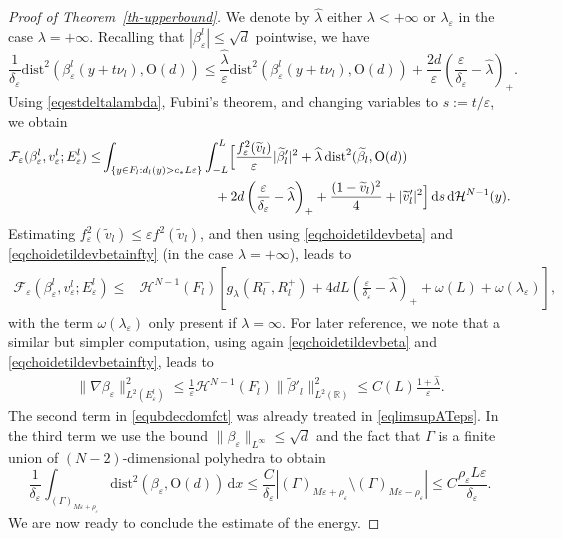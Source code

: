 \documentclass[a4paper,reqno]{amsart}
\newcommand\R{\mathbb{R}}
\newcommand\calH{\mathcal{H}}
\newcommand\dist{{\mathrm{dist}}}
\newcommand\eps{{\varepsilon}}
\theoremstyle{remark}
\newcommand\dx{{\,\mathrm{d}x}}
\newcommand\ds{{\,\mathrm{d}s}}
\newcommand{\F}{\mathcal{F}}
\newcommand{\On}{\mathrm{O}(d)}
\newcommand{\dhN}{{\,\mathrm{d}\calH^{N-1}}}
\numberwithin{equation}{section}
\begin{document}
\begin{proof}[Proof of Theorem~\ref{th-upperbound}]
 We denote by $\widehat\lambda$ either $\lambda<+\infty$ or $\lambda_\eps$ in the case $\lambda=+\infty$.
Recalling that
	$|\beta^l_\eps|\le\sqrt d$ pointwise, we have
	\begin{equation}\label{eqestdeltalambda}
		\frac{1}{\delta_\eps} \dist^2(\beta_\eps^l(y+t\nu_l),\On)
		\le
		\frac{\widehat\lambda}{\eps} \dist^2(\beta_\eps^l(y+t\nu_l),\On)
		+ \frac{2d}{\eps}\left(\frac{\eps}{\delta_\eps}-\widehat\lambda\right)_+ .
	\end{equation}
Using \eqref{eqestdeltalambda}, Fubini's theorem, and changing variables to $s:=t/\eps$,  we obtain
	\begin{equation}\label{eqFubiniRl}
		\begin{split}
			\F_\eps(\beta_\eps^l,v^l_\eps;E^l_\eps)
			\le&\int_{\{y\in F_l: d_l(y)> c_*L\eps\}}
			\int_{-L}^{L}
\Bigl[			\frac{f_\eps^2(\widetilde v_l)}{\eps}
			|\widetilde \beta'_l|^2  + \widehat\lambda\,\dist^2(\widetilde \beta_l,\On) \\
			& \hskip3cm+
			2d\left(\frac{\eps}{\delta_\eps}-\widehat\lambda\right)_++
			\frac{(1-\widetilde v_l)^2}{4}
			+ |\widetilde v'_l|^2 \Bigr]\ds\dhN(y).
	\end{split}\end{equation}
	Estimating  $f_\eps^2(\widetilde v_l)\le {\eps}f^2(\widetilde v_l)$,
	and then using \eqref{eqchoidetildevbeta} and \eqref{eqchoidetildevbetainfty} (in the case $\lambda=+\infty$), leads to
	\begin{equation}\label{eqestFepsRepsl}
		\begin{split}
			\F_\eps(\beta_\eps^l,v^l_\eps;E^l_\eps)
			\le& \calH^{N-1}(F_l)
			\left[g_\lambda(R^-_l,R^+_l)+4dL \left(\frac{\eps}{\delta_\eps}-\widehat\lambda\right)_++\omega(L)+\omega(\lambda_\eps)\right],
	\end{split}\end{equation}
with the term $\omega(\lambda_\eps)$ only present if $\lambda=\infty$.
	For later reference, we note that a similar but simpler computation, using
	again \eqref{eqchoidetildevbeta} and \eqref{eqchoidetildevbetainfty},
leads to
\begin{equation}\label{eqestimatenablabetaepsRl}
\begin{split}
\|\nabla \beta_\eps\|_{L^2(E^l_\eps)}^2
\le \frac1{\eps}\calH^{N-1}(F_l) \|\widetilde \beta'_l\|_{L^2(\R)}^2
\le C(L) \frac{1+\widehat \lambda}
{\eps}
.
\end{split}\end{equation}
	The second term in \eqref{equbdecdomfct} was already treated in \eqref{eqlimsupATeps}.
	In the third term we use the bound $\|\beta_\eps\|_{L^\infty}\le\sqrt d$ 
	and the fact that $\Gamma$ is a finite union of $(N-2)$-dimensional polyhedra
	to obtain
	\begin{equation}\label{equbdecdomfct3}
\frac1{\delta_\eps} \int_{(\Gamma)_{M\eps+\rho_\eps}}
\dist^2(\beta_\eps, \On)\dx
\le \frac{C}{\delta_\eps}| (\Gamma)_{M\eps+\rho_\eps}\setminus (\Gamma)_{M\eps-\rho_\eps}|
\le C \frac{\rho_\eps L\eps }{\delta_\eps}.
	\end{equation}
	We are now ready to conclude the estimate of the energy. 
	

\end{proof}
\end{document}
